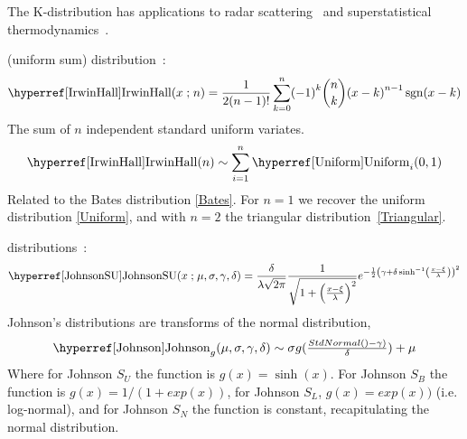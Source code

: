 %



The K-distribution has applications to radar scattering~\cite{Jakeman1978,Redding1999} and superstatistical thermodynamics~\cite[Eq.~21]{Dixit2013}.


\secbreak
 (uniform sum) distribution~\cite{Irwin1927, Hall1927, Johnson1995}:
\begin{align}
\label{IrwinHall}
\opr{IrwinHall} (x\given n) =\frac{1}{2\Left(n-1\Right)!}\sum_{k=0}^{n}\Left(-1\Right)^k\binom{n}{k}\Left(x-k\Right)^{n-1}\op{sgn}(x-k)
\checked
\end{align}
The sum of $n$ independent standard uniform variates. 
\[
\opr{IrwinHall}(n) \sim \sum_{i=1}^{n} \opr{Uniform}_i(0,1) \checked
\notag
\]
Related to the Bates distribution \eqref{Bates}. For $n=1$ we recover the uniform distribution \eqref{Uniform}, and with $n=2$ the triangular distribution~\eqref{Triangular}.

\secbreak
{} distributions~\cite{Johsnson1949a,Johnson1994}:
\[
\label{JohnsonSU}
\opr{JohnsonSU}(x\given\mu, \sigma, \gamma, \delta) = 
\frac{\delta}{\lambda\sqrt{2\pi}} \frac{1}{\sqrt{1 + \left(\frac{x-\xi}{\lambda}\right)^2}} e^{-\frac{1}{2}\left(\gamma+\delta \sinh^{-1} \left(\frac{x-\xi}{\lambda}\right)\right)^2}
\]
Johnson's distributions are transforms of the normal distribution, 
\[
\opr{Johnson}_g(\mu, \sigma, \gamma, \delta) \sim \sigma g(\tfrac{StdNormal()-\gamma)}{\delta}) + \mu
\notag
\]
Where for Johnson $S_U$ the function is $g(x)=\sinh(x)$.
For Johnson $S_B$ the function is $g(x)=1/(1+exp(x))$, for Johnson $S_L$, $g(x)=exp(x))$ (i.e. log-normal), and for Johnson $S_N$ the function is constant, recapitulating the normal distribution.



